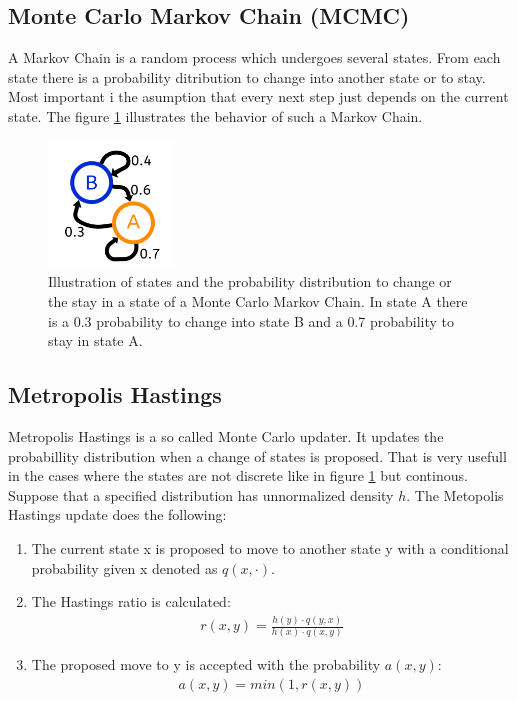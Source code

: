 \documentclass[english]{uzhpub}
\begin{document}
\subsection{Monte Carlo Markov Chain (MCMC)}
A Markov Chain is a random process which undergoes several states. From each state there is a probability ditribution to change into another state or to stay. Most important i the asumption that every next step just depends on the current state.
The figure \ref{fig:MCMC} illustrates the behavior of such a Markov Chain.

\begin{figure}[H]
  \centering
  \includegraphics[width=0.3\textwidth]{MCMC_Chain}
  \caption{Illustration of states and the probability distribution to change or the stay in a state of a Monte Carlo Markov Chain. In state A there is a 0.3 probability to change into state B and a 0.7 probability to stay in state A.}
  \label{fig:MCMC}
\end{figure}

\subsection{Metropolis Hastings}


Metropolis Hastings is a so called Monte Carlo updater. It updates the probabillity distribution when a change of states is proposed. That is very usefull in the cases where the states are not discrete like in figure \ref{fig:MCMC} but continous. Suppose that a specified distribution has unnormalized density $h$. The Metopolis Hastings update does the following:
\begin{enumerate}
  \item The current state x is proposed to move to another state y with a conditional probability given x denoted as $q(x,\cdot)$.
  \item The Hastings ratio is calculated:
  \begin{align}
    r(x,y) = \frac{h(y) \cdot q(y,x)}{h(x) \cdot q(x,y)} \label{eq:r(x,y)}
  \end{align}
  \item The proposed move to y is accepted with the probability $a(x,y)$:
  \begin{align}
    a(x,y) = min(1,r(x,y))
  \end{align}
\end{enumerate}
\end{document}
